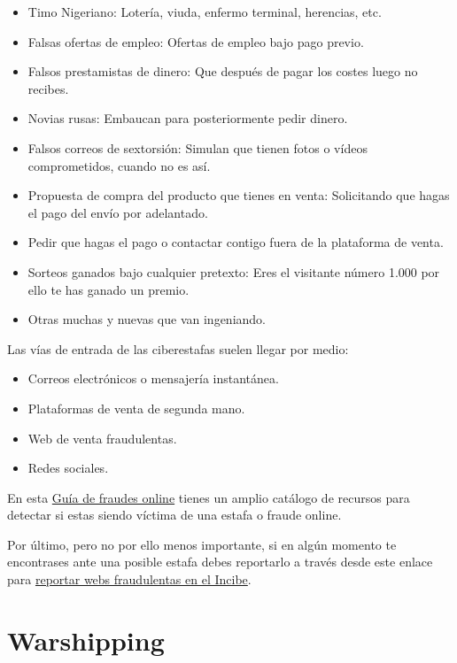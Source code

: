 \documentclass[
  spanish,
  a4paper,
  openany]{book}
\begin{document}
\begin{itemize}
\item
  Timo Nigeriano: Lotería, viuda, enfermo terminal, herencias, etc.
\item
  Falsas ofertas de empleo: Ofertas de empleo bajo pago previo.
\item
  Falsos prestamistas de dinero: Que después de pagar los costes luego no recibes.
\item
  Novias rusas: Embaucan para posteriormente pedir dinero.
\item
  Falsos correos de sextorsión: Simulan que tienen fotos o vídeos comprometidos, cuando no es así.
\item
  Propuesta de compra del producto que tienes en venta: Solicitando que hagas el pago del envío por adelantado.
\item
  Pedir que hagas el pago o contactar contigo fuera de la plataforma de venta.
\item
  Sorteos ganados bajo cualquier pretexto: Eres el visitante número 1.000 por ello te has ganado un premio.
\item
  Otras muchas y nuevas que van ingeniando.
\end{itemize}

Las vías de entrada de las ciberestafas suelen llegar por medio:

\begin{itemize}
\item
  Correos electrónicos o mensajería instantánea.
\item
  Plataformas de venta de segunda mano.
\item
  Web de venta fraudulentas.
\item
  Redes sociales.
\end{itemize}

En esta \href{https://www.osi.es/es/guia-fraudes-online}{Guía de fraudes online} tienes un amplio catálogo de recursos para detectar si estas siendo víctima de una estafa o fraude online.

Por último, pero no por ello menos importante, si en algún momento te encontrases ante una posible estafa debes reportarlo a través desde este enlace para \href{https://www.incibe.es/protege-tu-empresa/reporte-fraude}{reportar webs fraudulentas en el Incibe}.

\hypertarget{warshipping}{%
\section{Warshipping}\label{warshipping}}
\end{document}
